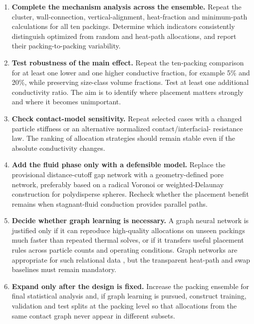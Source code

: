 \documentclass[12pt,a4paper]{article}
\begin{document}
	\begin{enumerate}
		\item \textbf{Complete the mechanism analysis across the ensemble.} Repeat
		the cluster, wall-connection, vertical-alignment, heat-fraction and
		minimum-path calculations for all ten packings. Determine which indicators
		consistently distinguish optimized from random and heat-path allocations,
		and report their packing-to-packing variability.
		
		\item \textbf{Test robustness of the main effect.} Repeat the ten-packing
		comparison for at least one lower and one higher conductive fraction, for
		example 5\% and 20\%, while preserving size-class volume fractions. Test at
		least one additional conductivity ratio. The aim is to identify where
		placement matters strongly and where it becomes unimportant.
		
		\item \textbf{Check contact-model sensitivity.} Repeat selected cases with a
		changed particle stiffness or an alternative normalized contact/interfacial-
		resistance law. The ranking of allocation strategies should remain stable
		even if the absolute conductivity changes.
		
		\item \textbf{Add the fluid phase only with a defensible model.} Replace the
		provisional distance-cutoff gap network with a geometry-defined pore network,
		preferably based on a radical Voronoi or weighted-Delaunay construction for
		polydisperse spheres. Recheck whether the placement benefit remains when
		stagnant-fluid conduction provides parallel paths.
		
		\item \textbf{Decide whether graph learning is necessary.} A graph neural
		network is justified only if it can reproduce high-quality allocations on
		unseen packings much faster than repeated thermal solves, or if it transfers
		useful placement rules across particle counts and operating conditions.
		Graph networks are appropriate for such relational data \cite{Battaglia2018},
		but the transparent heat-path and swap baselines must remain mandatory.
		
		\item \textbf{Expand only after the design is fixed.} Increase the packing
		ensemble for final statistical analysis and, if graph learning is pursued,
		construct training, validation and test splits at the packing level so that
		allocations from the same contact graph never appear in different subsets.
	\end{enumerate}
	
\end{document}
